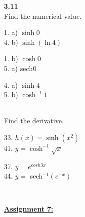 \documentclass{letter}
\begin{document}
\begin{itemize}
		\textbf{3.11}\\
		
		Find the numerical value.\\
		\begin{minipage}[t]{0.3\textwidth}
			1. a) $\sinh 0$\\
			4. b) $\sinh (\ln 4)$
		\end{minipage}
		\begin{minipage}[t]{0.3\textwidth}
			1. b) $\cosh 0$\\
			5. a) $\text{sech} 0$
		\end{minipage}
		\begin{minipage}[t]{0.3\textwidth}
			4. a) $\sinh 4$\\
			5. b) $\cosh^{-1} 1$\\
		\end{minipage}\\
		
		Find the derivative.\\
		\begin{minipage}[t]{0.5\textwidth}
			33. $h(x) = \sinh(x^2)$\\
			41. $y = \cosh^{-1} \sqrt x$
		\end{minipage}
		\begin{minipage}[t]{0.5\textwidth}
			37. $y = e^{cosh 3x}$\\
			44. $y = $ sech$^{-1} (e^{-x})$
		\end{minipage}\\
	\end{itemize}
	\clearpage
	\large\underline{\textbf{Assignment 7:}}
\end{document}
